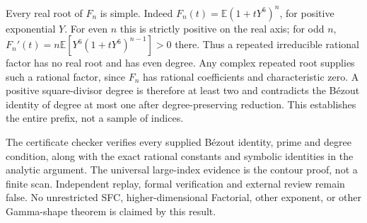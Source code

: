 \documentclass[11pt]{article}
\begin{document}
Every real root of $F_n$ is simple. Indeed
$F_n(t)=\mathbb E(1+tY^6)^n$, for positive exponential $Y$.
For even $n$ this is strictly positive on the real axis; for odd $n$,
$F_n'(t)=n\mathbb E[Y^6(1+tY^6)^{n-1}]>0$ there.
Thus a repeated irreducible rational factor has no real root and has even
degree. Any complex repeated root supplies such a rational factor, since
$F_n$ has rational coefficients and characteristic zero.
A positive square-divisor degree is therefore at least two and contradicts
the B\'ezout identity of degree at most one after degree-preserving
reduction. This establishes the entire prefix, not a sample of indices.

The certificate checker verifies every supplied B\'ezout identity, prime
and degree condition, along with the exact rational constants and symbolic
identities in the analytic argument. The universal large-index evidence
is the contour proof, not a finite scan. Independent replay, formal
verification and external review remain false. No unrestricted SFC,
higher-dimensional Factorial, other exponent, or other Gamma-shape theorem
is claimed by this result.
\end{document}

